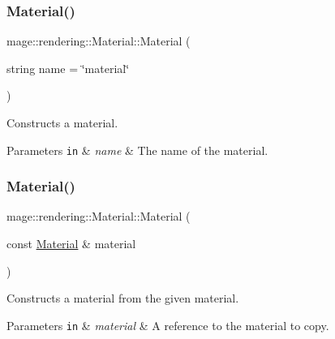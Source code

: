 \subsubsection{\texorpdfstring{Material()}{Material()}\hspace{0.1cm}{\footnotesize\ttfamily [1/3]}}
{\footnotesize\ttfamily mage\+::rendering\+::\+Material\+::\+Material (\begin{DoxyParamCaption}\item[{string}]{name = {\ttfamily \char`\"{}material\char`\"{}} }\end{DoxyParamCaption})\hspace{0.3cm}{\ttfamily [explicit]}}

Constructs a material.


\begin{DoxyParams}[1]{Parameters}
\mbox{\tt in}  & {\em name} & The name of the material. \\
\hline
\end{DoxyParams}
\hypertarget{classmage_1_1rendering_1_1_material_ac7cffca59fe250f10c2e68a875a03e91}{}\label{classmage_1_1rendering_1_1_material_ac7cffca59fe250f10c2e68a875a03e91} 
\subsubsection{\texorpdfstring{Material()}{Material()}\hspace{0.1cm}{\footnotesize\ttfamily [2/3]}}
{\footnotesize\ttfamily mage\+::rendering\+::\+Material\+::\+Material (\begin{DoxyParamCaption}\item[{const \hyperlink{classmage_1_1rendering_1_1_material}{Material} \&}]{material }\end{DoxyParamCaption})\hspace{0.3cm}{\ttfamily [default]}}

Constructs a material from the given material.


\begin{DoxyParams}[1]{Parameters}
\mbox{\tt in}  & {\em material} & A reference to the material to copy. \\
\hline
\end{DoxyParams}
\hypertarget{classmage_1_1rendering_1_1_material_a52f4b3b0849b96306ea79c746070c6ba}{}\label{classmage_1_1rendering_1_1_material_a52f4b3b0849b96306ea79c746070c6ba} 
